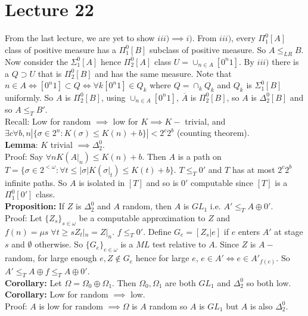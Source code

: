 \documentclass{article}
\begin{document}
      \section{Lecture 22}
      From the last lecture, we are yet to show $iii) \implies i)$. From $iii)$, every $\Pi^0_1[A]$ class of positive measure has a $\Pi^0_1[B]$ subclass of positive measure. So $A \leq_{LR} B$. Now consider the $\Sigma^0_1[A]$ hence $\Pi^0_2[A]$ class $U = \cup_{n\in A} [0^n 1]$. By $iii)$ there is a $Q \supset U$ that is $\Pi^0_2[B]$ and has the same measure. Note that $n \in A \iff [0^n1] \subset Q \iff \forall k [0^n1] \in Q_k$ where $Q = \cap_k Q_k$ and $Q_k$ is $\Sigma^0_1[B]$ uniformly. So $A$ is $\Pi^0_2[B]$, using $\cup_{n\in A} [0^n1]$, $\overline{A} $ is $\Pi^0_2[B]$, so $A $ is $\Delta^0_2[B]$ and so $A \leq_T B'$. \\
      Recall: Low for random $\implies $ low for $K \implies K - $ trivial, and $\exists c \forall b,n | \{\sigma \in 2^n: K(\sigma) \leq K(n) + b\}| < 2^c 2^b$ (counting theorem). \\
      \textbf{Lemma}:  $K$ trivial $\implies \Delta^0_2$.\\
      Proof: Say $\forall n K(A|_n) \leq K(n) + b$. Then $A$ is a path on $T = \{\sigma \in 2^{<\omega}: \forall t \leq |\sigma| K(\sigma|_t) \leq K(t) + b\}$. $T \leq_T 0'$ and $T$ has at most $2^c 2^b$ infinite paths. So $A$ is isolated in $[T]$ and so is $0'$ computable since $[T]$ is a $\Pi^0_1[0']$ class.
      \\
      \textbf{Proposition:} If $Z$ is $\Delta^0_2$ and $A$ random, then $A$ is $GL_1$ i.e. $A' \leq_TA \oplus 0'$.\\
      Proof: Let $\{Z_s\}_{s\in \omega}$ be a computable approximation to $Z$ and $f(n) = \mu s \; \forall t \geq s Z_t|_n = Z|_n$. $f \leq_T 0'$. Define $G_e  = [Z_s|e] $ if $e$ enters $A'$ at stage $s$ and $\emptyset$ otherwise. So $\{G_e\}_{e \in \omega}$ is a $ML$ test relative to $A$. Since $Z$ is $A-$ random, for large enough $e, Z \not \in G_e$ hence for large $e$, $e \in A' \iff e \in A'_{f(e)}$. So $A' \leq_TA \oplus f \leq_TA\oplus 0'$.\\
      \textbf{Corollary:} Let $\Omega = \Omega_0 \oplus \Omega_1$. Then $\Omega_0, \Omega_1$ are both $GL_1$ and $\Delta^0_2$ so both low.\\
      \textbf{Corollary:} Low for random $\implies$ low.\\
      Proof: $A$ is low for random $\implies \Omega$ is $A$ random so $A$ is $GL_1$ but $A$ is also $\Delta^0_2$.\\
\end{document}
